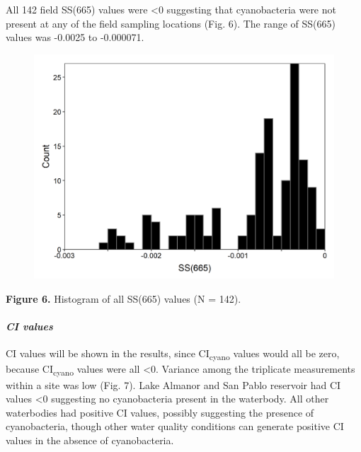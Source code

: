 \documentclass[
]{article}
\begin{document}
All 142 field SS(665) values were \textless0 suggesting that
cyanobacteria were not present at any of the field sampling locations
(Fig. 6). The range of SS(665) values was -0.0025 to -0.000071.

\begin{figure}
\includegraphics[width=27.08in]{../Data/Figures_output/ss665_hist} \end{figure}

\textbf{Figure 6.} Histogram of all SS(665) values (N = 142).

\hypertarget{ci-values}{%
\paragraph{\texorpdfstring{\emph{CI
values}}{CI values}}\label{ci-values}}

CI values will be shown in the results, since CI\textsubscript{cyano}
values would all be zero, because CI\textsubscript{cyano} values were
all \textless0. Variance among the triplicate measurements within a site
was low (Fig. 7). Lake Almanor and San Pablo reservoir had CI values
\textless0 suggesting no cyanobacteria present in the waterbody. All
other waterbodies had positive CI values, possibly suggesting the
presence of cyanobacteria, though other water quality conditions can
generate positive CI values in the absence of cyanobacteria.
\end{document}
